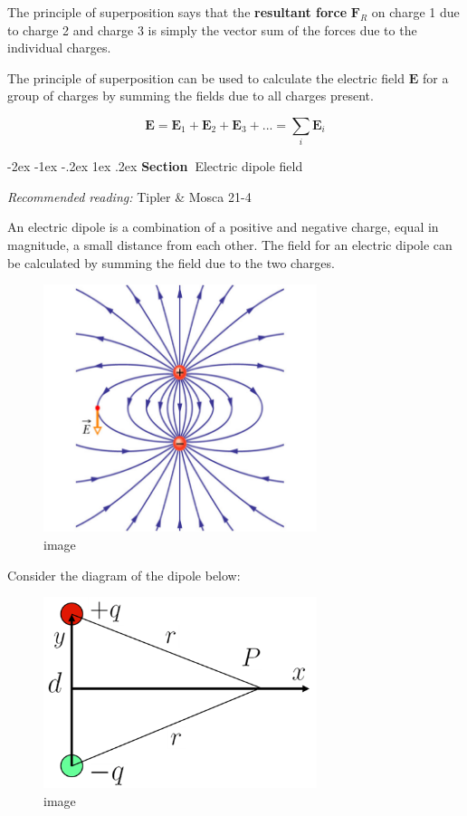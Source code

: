 \documentclass[
]{book}
\makeatletter
\renewcommand\section{%
\@startsection{section}{1}{\z@}%
              {-2ex \@plus -1ex \@minus -.2ex}%
              {1ex \@plus .2ex}%
              {\sffamily\bfseries\large\noindent Section~}}
\numberwithin{equation}{section}
\makeatother
\begin{document}
The principle of superposition says that the \textbf{resultant force} \(\mathbf{F}_R\)
on charge 1 due to charge 2 and charge 3 is simply the vector sum of the
forces due to the individual charges.

The principle of superposition can be used to calculate the electric
field \(\mathbf{E}\) for a group of charges by summing the fields due to all
charges present.

\begin{equation}
\label{eq:superposition}
\mathbf{E} = \mathbf{E}_1 + \mathbf{E}_2 + \mathbf{E}_3 + ... = \sum_i \mathbf{E}_i 
\end{equation}

\hypertarget{electric-dipole-field}{%
\section{Electric dipole field}\label{electric-dipole-field}}

\emph{Recommended reading:} Tipler \& Mosca 21-4

An electric dipole is a combination of a positive and negative charge,
equal in magnitude, a small distance from each other. The field for an
electric dipole can be calculated by summing the field due to the two
charges.

\begin{figure}
\centering
\includegraphics[width=80mm,height=\textheight]{Figures/dipole_field.png}
\caption{image}
\end{figure}

Consider the diagram of the dipole below:

\begin{figure}
\centering
\includegraphics[width=80mm,height=\textheight]{Figures/dipole_diagram.png}
\caption{image}
\end{figure}
\end{document}

